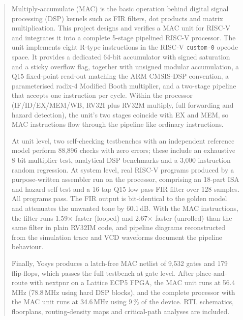 \documentclass[11pt,a4paper]{report}
\newcommand{\code}[1]{\texttt{#1}}
\begin{document}
\begin{abstract}
\noindent
Multiply-accumulate (MAC) is the basic operation behind digital signal
processing (DSP) kernels such as FIR filters, dot products and matrix
multiplication. This project designs and verifies a MAC unit for RISC-V and
integrates it into a complete 5-stage pipelined RISC-V processor. The unit
implements eight R-type instructions in the RISC-V \code{custom-0} opcode
space. It provides a dedicated 64-bit accumulator with signed saturation and a
sticky overflow flag, together with unsigned modular accumulation, a Q15
fixed-point read-out matching the ARM CMSIS-DSP convention, a parameterised
radix-4 Modified Booth multiplier, and a two-stage pipeline that accepts one
instruction per cycle. Within the processor (IF/ID/EX/MEM/WB, RV32I plus RV32M
multiply, full forwarding and hazard detection), the unit's two stages coincide
with EX and MEM, so MAC instructions flow through the pipeline like ordinary
instructions.

At unit level, two self-checking testbenches with an independent reference
model perform 88{,}896 checks with zero errors; these include an exhaustive
8-bit multiplier test, analytical DSP benchmarks and a 3{,}000-instruction
random regression. At system level, real RISC-V programs produced by a
purpose-written assembler run on the processor, comprising an 18-part ISA and
hazard self-test and a 16-tap Q15 low-pass FIR filter over 128 samples. All
programs pass. The FIR output is bit-identical to the golden model and
attenuates the unwanted tone by 60.1\,dB. With the MAC instructions, the filter
runs 1.59$\times$ faster (looped) and 2.67$\times$ faster (unrolled) than the
same filter in plain RV32IM code, and pipeline diagrams reconstructed from the
simulation trace and VCD waveforms document the pipeline behaviour.

Finally, Yosys produces a latch-free MAC netlist of 9{,}532 gates and 179
flip-flops, which passes the full testbench at gate level. After
place-and-route with nextpnr on a Lattice ECP5 FPGA, the MAC unit runs at
56.4\,MHz (78.8\,MHz using hard DSP blocks), and the complete processor with
the MAC unit runs at 34.6\,MHz using 9\,\% of the device. RTL schematics,
floorplans, routing-density maps and critical-path analyses are included.
\end{abstract}

\tableofcontents
\listoffigures
\listoftables

\end{document}
